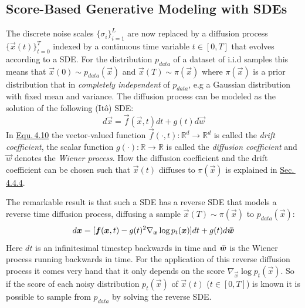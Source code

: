 \subsection{Score-Based Generative Modeling with SDEs} \label{sec:4.4.1}
The discrete noise scales $\{\sigma_i\}_{i=1}^L$ are now replaced by a diffusion process $\{\vec{x}(t)\}_{t=0}^T$ indexed by a continuous time variable $t\in[0,T]$ that evolves according to a SDE. For the distribution $p_{data}$ of a dataset of i.i.d samples this means that $\vec{x}(0)\sim p_{data}(\vec{x})$ and $\vec{x}(T)\sim \pi(\vec{x})$ where $\pi(\vec{x})$ is a prior distribution that in \textit{completely independent} of $p_{data}$, e.g a Gaussian distribution with fixed mean and variance. The diffusion process can be modeled as the solution of the following (Itô) SDE:
%
\begin{equation} \label{equ:4.10}
    d\vec{x}=\vec{f}(\vec{x},t)dt+g(t)d\vec{w}
\end{equation}
%
In \hyperref[equ:4.10]{Equ.\,4.10} the vector-valued function $\vec{f}(\cdot,t):\mathbb{R}^d\rightarrow\mathbb{R}^d$ is called the \textit{drift coefficient}, the scalar function $g(\cdot):\mathbb{R}\rightarrow\mathbb{R}$ is called the \textit{diffusion coefficient} and $\vec{w}$ denotes the \textit{Wiener process}. How the diffusion coefficient and the drift coefficient can be chosen such that $\vec{x}(t)$ diffuses to $\pi(\vec{x})$ is explained in \hyperref[sec:4.4.4]{Sec.\,4.4.4}.

The remarkable result \cite{ANDERSON} is that such a SDE has a reverse SDE that models a reverse time diffusion process, diffusing a sample $\vec{x}(T)\sim\pi(\vec{x})$ to $p_{data}(\vec{x})$:
%
\begin{equation} \label{equ:4.11}
    d\vec{x}=[\vec{f}(\vec{x},t)-g(t)^2\nabla_{\vec{x}}\log p_t(\vec{x})]dt+g(t)d\vec{\Bar{w}}
\end{equation}
%
Here $dt$ is an infinitesimal timestep backwards in time and $\vec{\Bar{w}}$ is the Wiener process running backwards in time. For the application of this reverse diffusion process it comes very hand that it only depends on the score $\nabla_{\vec{x}}\log p_t(\vec{x})$. So if the score of each noisy distribution $p_t(\vec{x})$ of $\vec{x}(t)$ ($t\in[0, T]$) is known it is possible to sample from $p_{data}$ by solving the reverse SDE.
%
